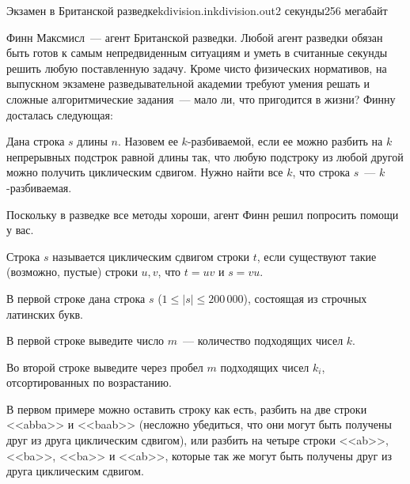 \begin{problem}{Экзамен в Британской разведке}{kdivision.in}{kdivision.out}{2 секунды}{256 мегабайт}
                                                                    

Финн Максмисл~--- агент Британской разведки. Любой агент разведки обязан быть готов к самым непредвиденным ситуациям и уметь в считанные секунды решить любую поставленную задачу.
Кроме чисто физических нормативов, на выпускном экзамене разведывательной академии требуют умения решать и сложные алгоритмические задания~--- мало ли, что пригодится в жизни?
Финну досталась следующая:

Дана строка $s$ длины $n$. Назовем ее $k$-разбиваемой, если ее можно разбить на $k$ непрерывных подстрок равной длины так, что любую подстроку из любой другой можно получить циклическим сдвигом. 
Нужно найти все $k$, что строка $s$~--- $k$-разбиваемая.

Поскольку в разведке все методы хороши, агент Финн решил попросить помощи у вас.

Строка $s$ называется циклическим сдвигом строки $t$, если существуют такие (возможно, пустые) строки $u, v$, что $t = uv$ и $s = vu$.

\InputFile
В первой строке дана строка $s$ ($1 \le |s| \le 200\,000$), состоящая из строчных латинских букв.

\OutputFile
В первой строке выведите число $m$~--- количество подходящих чисел $k$.

Во второй строке выведите через пробел $m$ подходящих чисел $k_i$, отсортированных по возрастанию.

\Example
\begin{example}%
%
%
\end{example}

\Note
В первом примере можно оставить строку как есть, разбить на две строки <<abba>> и <<baab>> (несложно убедиться, что они могут быть получены друг из друга циклическим сдвигом),
или разбить на четыре строки <<ab>>, <<ba>>, <<ba>> и <<ab>>, которые так же могут быть получены друг из друга циклическим сдвигом.

\end{problem}